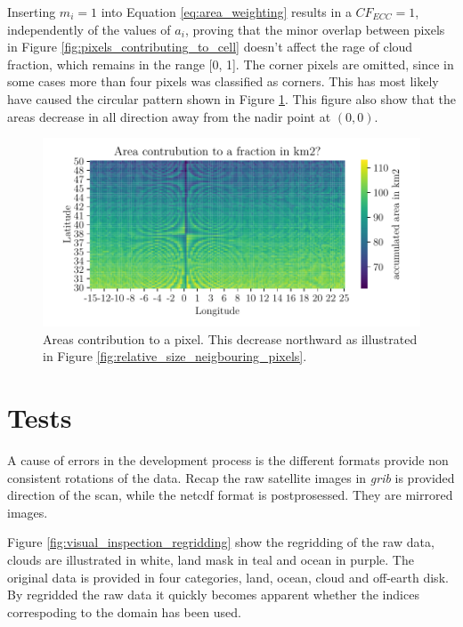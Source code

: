 Inserting $m_i = 1$ into Equation \eqref{eq:area_weighting} results in a $CF_{ECC}=1$, independently of the values of $a_i$, proving that the minor overlap between pixels in Figure \ref{fig:pixels_contributing_to_cell} doesn't affect the rage of cloud fraction, which remains in the range [0, 1]. The corner pixels are omitted, since in some cases more than four pixels was classified as corners. This has most likely have caused the circular pattern shown in Figure \ref{fig:area_pixel_signal}. This figure also show that the areas decrease in all direction away from the nadir point at $(0,0)$.
\begin{figure}[ht]
    \centering
    \includegraphics{python_figs/signal_area_pixel.pdf}
    \caption{Areas contribution to a pixel. This decrease northward as illustrated in Figure \ref{fig:relative_size_neigbouring_pixels}.}
    \label{fig:area_pixel_signal}
\end{figure} 

\section{Tests}
A cause of errors in the development process is the different formats provide non consistent rotations of the data. Recap the raw satellite images in \textit{grib} is provided  direction of the scan, while the \acrshort{netcdf} format is postprosessed. They are mirrored images.

Figure \ref{fig:visual_inspection_regridding} show the regridding of the raw data, clouds are illustrated in white, land mask in teal and ocean in purple. The original data is provided in four categories, land, ocean, cloud and off-earth disk. By regridded the raw data it quickly becomes apparent whether the indices correspoding to the domain has been used. 


